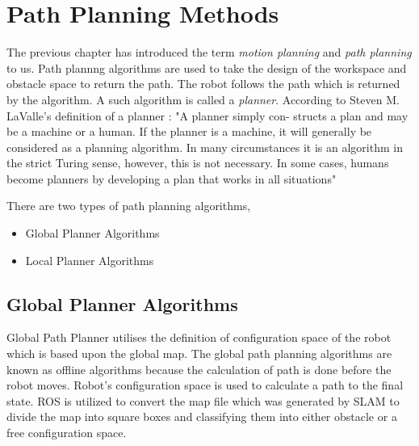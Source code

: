 \section{Path Planning Methods}
The previous chapter has introduced the term \textit{motion planning} and \textit{path planning} to us. Path plannng algorithms are used to take the design of the workspace and obstacle space to return the path. The robot follows the path which is returned by the algorithm.
A such algorithm is called a \textit{planner}. According to Steven M. LaValle's definition of a planner \cite{lavelle} : "A planner simply con-
structs a plan and may be a machine or a human. If the planner is a machine, it will
generally be considered as a planning algorithm. In many circumstances it is an algorithm
in the strict Turing sense, however, this is not necessary. In some cases, humans become
planners by developing a plan that works in all situations"

There are two types of path planning algorithms,
\begin{itemize}
    \item Global Planner Algorithms
    \item Local Planner Algorithms
\end{itemize}

\subsection{Global Planner Algorithms}
Global Path Planner utilises the definition of configuration space of the robot which is based upon the global map.
The global path planning algorithms are known as offline algorithms because the calculation of path is done before the robot moves. Robot's configuration space is used to calculate a path to the final state.
ROS is utilized to convert the map file which was generated by SLAM to divide the map into square boxes and classifying 
them into either obstacle or a free configuration space.

